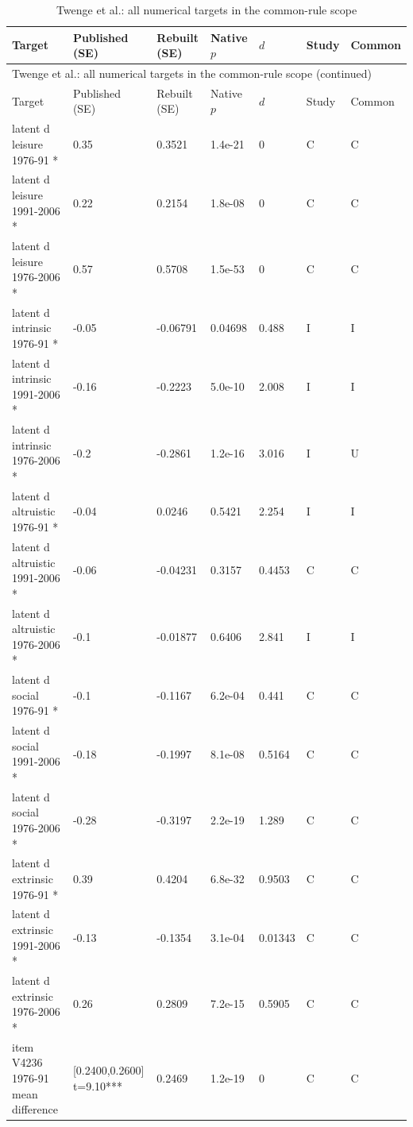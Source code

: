 {\scriptsize\setlength{\tabcolsep}{3pt}\renewcommand{\arraystretch}{1.06}
\begin{longtable}{@{}p{.245\linewidth}p{.17\linewidth}p{.17\linewidth}p{.085\linewidth}p{.060\linewidth}p{.08\linewidth}p{.07\linewidth}@{}}
\caption{Twenge et al.: all numerical targets in the common-rule scope}\label{tab:all:twenge2010}\\
\toprule Target & Published (SE) & Rebuilt (SE) & Native $p$ & $d$ & Study & Common\\\midrule
\endfirsthead\multicolumn{7}{l}{\small Twenge et al.: all numerical targets in the common-rule scope (continued)}\\\toprule Target & Published (SE) & Rebuilt (SE) & Native $p$ & $d$ & Study & Common\\\midrule\endhead\bottomrule\endfoot
latent d leisure 1976-91 * & 0.35 & 0.3521 & 1.4e-21 & 0 & C & C\\
latent d leisure 1991-2006 * & 0.22 & 0.2154 & 1.8e-08 & 0 & C & C\\
latent d leisure 1976-2006 * & 0.57 & 0.5708 & 1.5e-53 & 0 & C & C\\
latent d intrinsic 1976-91 * & -0.05 & -0.06791 & 0.04698 & 0.488 & I & I\\
latent d intrinsic 1991-2006 * & -0.16 & -0.2223 & 5.0e-10 & 2.008 & I & I\\
latent d intrinsic 1976-2006 * & -0.2 & -0.2861 & 1.2e-16 & 3.016 & I & U\\
latent d altruistic 1976-91 * & -0.04 & 0.0246 & 0.5421 & 2.254 & I & I\\
latent d altruistic 1991-2006 * & -0.06 & -0.04231 & 0.3157 & 0.4453 & C & C\\
latent d altruistic 1976-2006 * & -0.1 & -0.01877 & 0.6406 & 2.841 & I & I\\
latent d social 1976-91 * & -0.1 & -0.1167 & 6.2e-04 & 0.441 & C & C\\
latent d social 1991-2006 * & -0.18 & -0.1997 & 8.1e-08 & 0.5164 & C & C\\
latent d social 1976-2006 * & -0.28 & -0.3197 & 2.2e-19 & 1.289 & C & C\\
latent d extrinsic 1976-91 * & 0.39 & 0.4204 & 6.8e-32 & 0.9503 & C & C\\
latent d extrinsic 1991-2006 * & -0.13 & -0.1354 & 3.1e-04 & 0.01343 & C & C\\
latent d extrinsic 1976-2006 * & 0.26 & 0.2809 & 7.2e-15 & 0.5905 & C & C\\
item V4236 1976-91 mean difference & [0.2400,0.2600] t=9.10*** & 0.2469 & 1.2e-19 & 0 & C & C\\

\end{longtable}}
